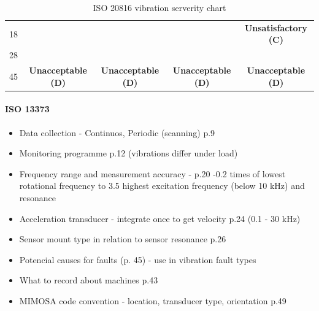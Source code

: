 \begin{table}[h]
\begin{adjustbox}{width=\columnwidth,center}
\begin{tabular}{|c|c|c|c|c|}
18                                                                                   & \cellcolor[HTML]{FD6864}                                                  & \cellcolor[HTML]{FD6864}                                                    & \cellcolor[HTML]{FD6864}                                                                     & \multirow{-2}{*}{\cellcolor[HTML]{F8A102}\textbf{Unsatisfactory (C)}}                         \\ \cline{1-1} \cline{5-5} 
28                                                                                   & \cellcolor[HTML]{FD6864}                                                  & \cellcolor[HTML]{FD6864}                                                    & \cellcolor[HTML]{FD6864}                                                                     & \cellcolor[HTML]{FD6864}                                                                      \\ \cline{1-1}
45                                                                                   & \multirow{-5}{*}{\cellcolor[HTML]{FD6864}\textbf{Unacceptable (D)}}       & \multirow{-4}{*}{\cellcolor[HTML]{FD6864}\textbf{Unacceptable (D)}}         & \multirow{-3}{*}{\cellcolor[HTML]{FD6864}\textbf{Unacceptable (D)}}                          & \multirow{-2}{*}{\cellcolor[HTML]{FD6864}\textbf{Unacceptable (D)}}                           \\ \hline
\end{tabular}
\end{adjustbox}
\caption{ISO 20816 vibration serverity chart \cite{noauthor_iso_2016}}
\label{tab:iso20816-vibration-severity}
\end{table}


\paragraph{ISO 13373}
\cite{noauthor_iso_2002}

\begin{itemize}
\itemsep0pt
\item Data collection - Continuos, Periodic (scanning) p.9 
\item Monitoring programme p.12 (vibrations differ under load)
\item Frequency range and measurement accuracy - p.20 -0.2 times of lowest rotational frequency to 3.5 highest excitation frequency (below 10 kHz) and resonance
\item Acceleration transducer - integrate once to get velocity p.24 (0.1 - 30 kHz)
\item Sensor mount type in relation to sensor resonance p.26 
\item Potencial causes for faults (p. 45) - use in vibration fault types
\item What to record about machines p.43
\item MIMOSA code convention - location, transducer type, orientation p.49
\end{itemize}

